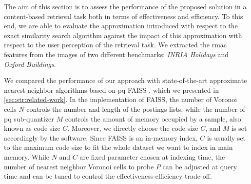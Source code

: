 The aim of this section is to assess the performance of the proposed solution in a content-based retrieval task both in terms of effectiveness and efficiency.
To this end, we are able to evaluate the approximation introduced with respect to the exact similarity search algorithm against the impact of this approximation with respect to the user perception of the retrieval task.
We extracted the \gls{rmac} features from the images of two different benchmarks: \emph{INRIA Holidays} and \emph{Oxford Buildings}.

We compared the performance of our approach with state-of-the-art approximate nearest neighbor algorithms based on \gls{pq} FAISS \cite{johnson2017billion}, which we presented in \ref{sec:str:related-work}.
In the implementation of FAISS, the number of Voronoi cells $N$ controls the number and length of the postings lists, while the number of \gls{pq} sub-quantizer $M$ controls the amount of memory occupied by a sample, also known as code size $C$.
Moreover, we directly choose the code size $C$, and $M$ is set accordingly by the software.
Since FAISS is an in-memory index, $C$ is usually set to the maximum code size to fit the whole dataset we want to index in main memory.
While $N$ and $C$ are fixed parameter chosen at indexing time, the number of nearest neighbor Voronoi cells to probe $P$ can be adjusted at query time and can be tuned to control the effectiveness-efficiency trade-off.

